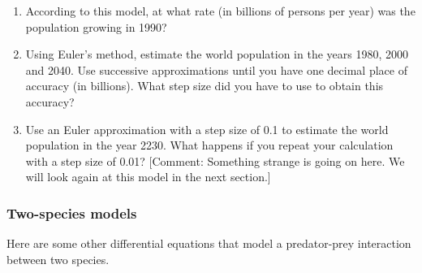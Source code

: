\begin{enumerate}
  \begin{enumerate}
  \item According to this model, at what rate (in billions of persons per year) was the population growing in 1990?

  \item Using Euler's method, estimate the world population in the years 1980, 2000 and 2040.  Use successive approximations until you have one decimal place of accuracy (in billions).  What step size did you have to use to obtain this accuracy?

  \item Use an Euler approximation with a step size of 0.1 to estimate the world population in the year 2230.  What happens if you repeat your calculation with a step size of 0.01?  [Comment:  Something strange is going on here.  We will look again at this model in the next section.]


\end{enumerate}
\end{enumerate}
\subsubsection{Two-species models}
\label{subsubsec:two-species-models}

Here are some other differential equations that model a predator-prey
interaction between two species.





